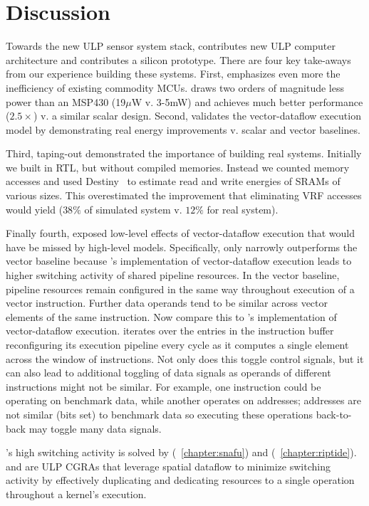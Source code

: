 \section{Discussion}
\label{manic:discuss}
Towards the new ULP sensor system stack, \manic contributes new ULP computer architecture and \msilicon contributes a silicon prototype.
% 
There are four key take-aways from our experience building these systems.
% 
First, \msilicon emphasizes even more the inefficiency of existing commodity MCUs.
% 
\manic draws two orders of magnitude less power than an MSP430 (19$\mu$W v. 3-5mW) and achieves much better performance ($2.5\times$) v. a similar scalar design.
% 
Second, \msilicon validates the vector-dataflow execution model by demonstrating real energy improvements v. scalar and vector baselines.


Third, taping-out \msilicon demonstrated the importance of building real systems.
% 
Initially we built \manic in RTL, but without compiled memories.
% 
Instead we counted memory accesses and used Destiny~\cite{destiny} to estimate read and write energies of SRAMs of various sizes.
% 
This overestimated the improvement that eliminating VRF accesses would yield ($38\%$ of simulated system v. $12\%$ for real system).

Finally fourth, \msilicon exposed low-level effects of vector-dataflow execution that would have be missed by high-level models.
% 
Specifically, \manic only narrowly outperforms the vector baseline because \manic's implementation of vector-dataflow execution leads to higher switching activity of shared pipeline resources.
% 
In the vector baseline, pipeline resources remain configured in the same way throughout execution of a vector instruction.
% 
Further data operands tend to be similar across vector elements of the same instruction.
% 
Now compare this to \manic's implementation of vector-dataflow execution.
% 
\manic iterates over the entries in the instruction buffer reconfiguring its execution pipeline every cycle as it computes a single element across the window of instructions.
% 
Not only does this toggle control signals, but it can also lead to additional toggling of data signals as operands of different instructions might not be similar.
% 
For example, one instruction could be operating on benchmark data, while another operates on addresses; addresses are not similar (bits set) to benchmark data so executing these operations back-to-back may toggle many data signals. 

\manic's high switching activity is solved by \snafu (~\autoref{chapter:snafu}) and \riptide (~\autoref{chapter:riptide}).
% 
\riptide and \snafu are ULP CGRAs that leverage spatial dataflow to minimize switching activity by effectively duplicating and dedicating resources to a single operation throughout a kernel's execution.
